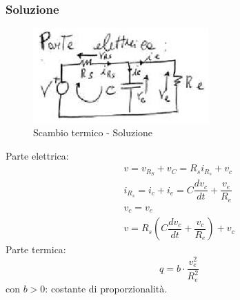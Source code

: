 \documentclass[a4paper]{report}
\begin{document}
\subsubsection{Soluzione}
\begin{figure}[!t]
  \centering
  \includegraphics[width=0.6\textwidth]{./images/esempio06-3.png}
  \caption{Scambio termico - Soluzione\label{fig:esempio06-3}}
\end{figure}
Parte elettrica:
\[
  \begin{array}{l}
    v = v_{R_S} + v_C = R_s i_{R_s} + v_c\\
    i_{R_s} = i_c + i_e = C \dfrac{dv_c}{dt} + \dfrac{v_e}{R_e}\\
    v_c = v_e\\
    v = R_s \left( C \dfrac{dv_c}{dt} + \dfrac{v_c}{R_e}\right) + v_c
  \end{array}
\]
Parte termica:
\[
  q = b \cdot \dfrac{v_e^2}{R_e^2}
\]
con $b>0$: costante di proporzionalit\`a.
\end{document}
